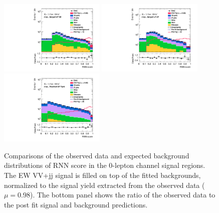 \begin{figure}[]
    \centering
    \includegraphics[width=0.45\textwidth]{figures/PostFit/Region_distRNN_DSRVBSHP_BMin0_J0_incJet1_L0_T0_incFat1_Y6051_incTag1_Fat1_GlobalFit_unconditionnal_mu1log}
    \includegraphics[width=0.45\textwidth]{figures/PostFit/Region_distRNN_DSRVBSLP_BMin0_J0_incJet1_L0_T0_incFat1_Y6051_incTag1_Fat1_GlobalFit_unconditionnal_mu1log}
    \includegraphics[width=0.45\textwidth]{figures/PostFit/Region_distRNN_DSRVBSFid_BMin0_T0_Y6051_incTag1_J2_L0_incJet1_GlobalFit_unconditionnal_mu1log}
      \caption{Comparisons of the observed data and expected background distributions of RNN score in the 0-lepton channel signal regions. The EW VV+jj signal is filled on top of the fitted backgrounds, normalized to the signal yield extracted from the observed data ($\mu = 0.98$). The bottom panel shows the ratio of the observed data to the post fit signal and background predictions.}
      \label{fig:postSR0lep}
\end{figure}
